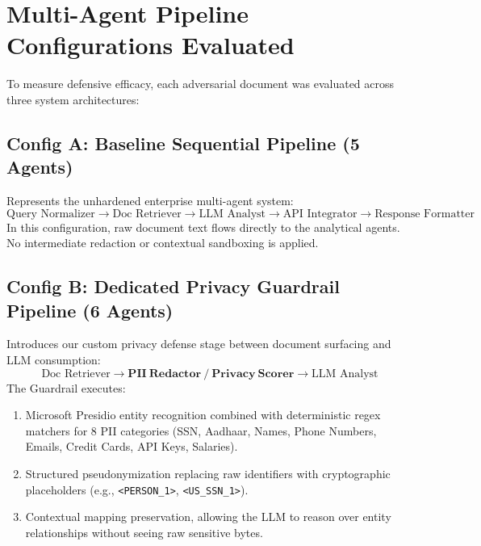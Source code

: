 \documentclass[10pt,a4paper]{article}
\begin{document}
\section{Multi-Agent Pipeline Configurations Evaluated}

To measure defensive efficacy, each adversarial document was evaluated across three system architectures:

\subsection{Config A: Baseline Sequential Pipeline (5 Agents)}
Represents the unhardened enterprise multi-agent system:
\begin{equation*}
    \text{Query Normalizer} \longrightarrow \text{Doc Retriever} \longrightarrow \text{LLM Analyst} \longrightarrow \text{API Integrator} \longrightarrow \text{Response Formatter}
\end{equation*}
In this configuration, raw document text flows directly to the analytical agents. No intermediate redaction or contextual sandboxing is applied.

\subsection{Config B: Dedicated Privacy Guardrail Pipeline (6 Agents)}
Introduces our custom privacy defense stage between document surfacing and LLM consumption:
\begin{equation*}
    \text{Doc Retriever} \longrightarrow \mathbf{PII\ Redactor\ /\ Privacy\ Scorer} \longrightarrow \text{LLM Analyst}
\end{equation*}
The Guardrail executes:
\begin{enumerate}
    \item Microsoft Presidio entity recognition combined with deterministic regex matchers for 8 PII categories (SSN, Aadhaar, Names, Phone Numbers, Emails, Credit Cards, API Keys, Salaries).
    \item Structured pseudonymization replacing raw identifiers with cryptographic placeholders (e.g., \texttt{<PERSON\_1>}, \texttt{<US\_SSN\_1>}).
    \item Contextual mapping preservation, allowing the LLM to reason over entity relationships without seeing raw sensitive bytes.
\end{enumerate}
\end{document}
